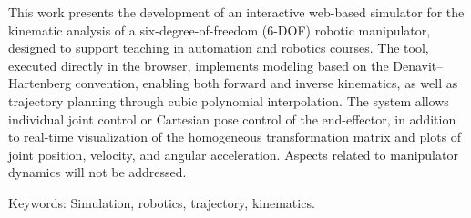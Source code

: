 \begin{foreignabstract}

This work presents the development of an interactive web-based simulator for the kinematic analysis of a six-degree-of-freedom (6-DOF) robotic manipulator, designed to support teaching in automation and robotics courses. The tool, executed directly in the browser, implements modeling based on the Denavit–Hartenberg convention, enabling both forward and inverse kinematics, as well as trajectory planning through cubic polynomial interpolation. The system allows individual joint control or Cartesian pose control of the end-effector, in addition to real-time visualization of the homogeneous transformation matrix and plots of joint position, velocity, and angular acceleration. Aspects related to manipulator dynamics will not be addressed.

Keywords: Simulation, robotics, trajectory, kinematics.

\end{foreignabstract}

